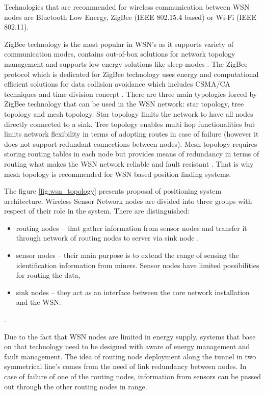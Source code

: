 \documentclass[../main.tex]{subfiles}
\begin{document}
Technologies that are recommended for wireless communication between WSN nodes are Bluetooth Low Energy, ZigBee (IEEE 802.15.4 based) or Wi-Fi (IEEE 802.11).

ZigBee technology is the most popular in WSN's as it supports variety of communication modes, contains out-of-box solutions for network topology management and supports low energy solutions like sleep modes \cite{ZigBee_applications}. The ZigBee protocol which is dedicated for ZigBee technology uses energy and computational efficient solutions for data collision avoidance which includes CSMA/CA techniques and time division concept \cite{WSN_monitoring, ZigBee_desc}. There are three main typologies forced by ZigBee technology that can be used in the WSN network: star topology, tree topology and mesh topology. Star topology limits the network to have all nodes directly connected to a sink. Tree topology enables multi hop functionalities but limits network flexibility in terms of adopting routes in case of failure (however it does not support redundant connections between nodes). Mesh topology requires storing routing tables in each node but provides means of redundancy in terms of routing what makes the WSN network reliable and fault resistant \cite{ZigBee_desc}. That is why mesh topology is recommended for WSN based position finding systems.

The figure \ref{fig:wsn_topology} presents proposal of positioning system architecture. Wireless Sensor Network nodes are divided into three groups with respect of their role in the system. There are distinguished:
\begin{itemize}
	\item routing nodes -- that gather information from sensor nodes and transfer it through network of routing nodes to server via sink node \cite{WSN_monitoring},
	\item sensor nodes -- their main purpose is to extend the range of sensing the identification information from miners. Sensor nodes have limited possibilities for routing the data,
	\item sink nodes -- they act as an interface between the core network installation and the WSN.
\end{itemize}.

Due to the fact that WSN nodes are limited in energy supply, systems that base on that technology need to be designed with aware of energy management and fault management. The idea of routing node deployment along the tunnel in two symmetrical line's comes from the need of link redundancy between nodes. In case of failure of one of the routing nodes, information from sensors can be passed out through the other routing nodes in range.
\end{document}
